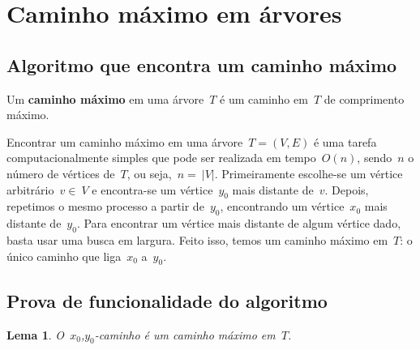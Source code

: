\documentclass[a4paper,12pt]{article}
\newtheorem{lem}{Lema}
\begin{document}
\section{Caminho máximo em árvores}\label{sec:caminhoMaximo}
	\subsection{Algoritmo que encontra um caminho máximo}

	Um \textbf{caminho máximo} em uma árvore~$T$ é um caminho 
	em~$T$ de comprimento máximo.

	Encontrar um caminho máximo em uma árvore~$T=(V,E)$ é uma tarefa
	computacionalmente simples que pode ser realizada em tempo~$O(n)$, 
	sendo~$n$ o número de vértices de~$T$, ou seja,~$n =~|V|$. 
	Primeiramente escolhe-se um vértice arbitrário~$v \in~V$ 
	e encontra-se um vértice~$y_0$ mais distante de~$v$.
	Depois, repetimos o mesmo processo a partir de~$y_0$, 
	encontrando um vértice~$x_0$ mais distante de~$y_0$. 
	Para encontrar um vértice mais distante de algum vértice dado, 
	basta usar uma busca em largura.  
	Feito isso, temos um caminho máximo em~$T$: o único
	caminho que liga~$x_0$ a~$y_0$.

	\bigskip

	\subsection{Prova de funcionalidade do algoritmo}

	\begin{lem}
	\label{lema:caminhoMax}
		O~$x_0$,$y_0$-caminho é um caminho máximo em~$T$.
	\end{lem}

	\bigskip
\end{document}

